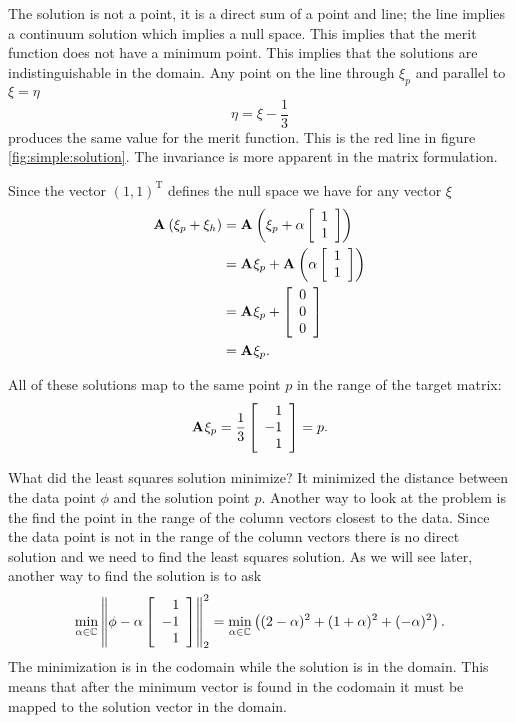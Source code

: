 The solution is not a point, it is a direct sum of a point and line; the line implies a continuum solution which implies a null space. This implies that the merit function does not have a minimum point. This implies that the solutions are indistinguishable in the domain. Any point on the line through $\xi_{p}$ and parallel to $\xi=\eta$ 
\begin{equation}
  \eta = \xi - \frac{1}{3}
\end{equation}
produces the same value for the merit function. This is the red line in figure \eqref{fig:simple:solution}. The invariance is more apparent in the matrix formulation.

Since the vector $(1,1)^{\mathrm{T}}$ defines the null space we have for any vector $\xi$
\begin{equation}
  \begin{split}
      \A{}\paren{\xi_{p}+\xi_{h}} &= \A{}\paren{\xi_{p}+\alpha\mat{c}{1\\1}}\\ 
      &= \A{}\xi_{p}+\A{}\paren{\alpha\mat{c}{1\\1}}\\
      &= \A{}\xi_{p} + \mat{c}{0\\0\\0} \\
      &= \A{}\xi_{p}.
  \end{split}
\end{equation}

All of these solutions map to the same point $p$ in the range of the target matrix:
\begin{equation}
  \A{}\xi_{p} = \frac{1}{3}\mat{r}{1\\-1\\1} = p.
  \label{eq:simple:map}
\end{equation}

What did the least squares solution minimize? It minimized the distance between the data point $\phi$ and the solution point $p$. Another way to look at the problem is the find the point in the range of the column vectors closest to the data. Since the data point is not in the range of the column vectors there is no direct solution and we need to find the least squares solution. As we will see later, another way to find the solution is to ask
\begin{equation}
  \min_{\alpha\in\cmplx{}} \normt{\phi-\alpha\mat{r}{1\\-1\\1}}^{2}=\min_{\alpha\in\cmplx{}} \paren{(2-\alpha)^{2}+(1+\alpha)^{2}+(-\alpha)^{2}}.
\end{equation}
The minimization is in the codomain while the solution is in the domain. This means that after the minimum vector is found in the codomain it must be mapped to the solution vector in the domain.

